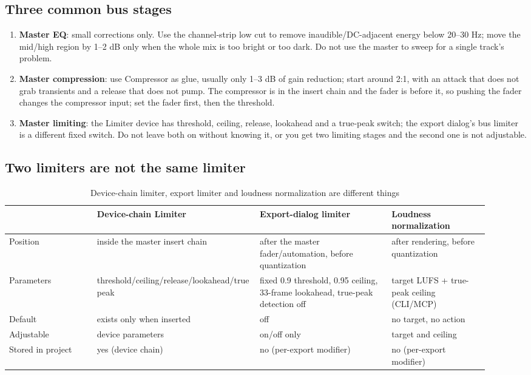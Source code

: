 \subsection{Three common bus stages}

\begin{enumerate}
  \item \textbf{Master EQ}: small corrections only. Use the channel-strip low cut to remove inaudible/DC-adjacent energy below 20--30 Hz; move the mid/high region by 1--2 dB only when the whole mix is too bright or too dark. Do not use the master to sweep for a single track's problem.
  \item \textbf{Master compression}: use Compressor as glue, usually only 1--3 dB of gain reduction; start around 2:1, with an attack that does not grab transients and a release that does not pump. The compressor is in the insert chain and the fader is before it, so pushing the fader changes the compressor input; set the fader first, then the threshold.
  \item \textbf{Master limiting}: the Limiter device has threshold, ceiling, release, lookahead and a true-peak switch; the export dialog's bus limiter is a different fixed switch. Do not leave both on without knowing it, or you get two limiting stages and the second one is not adjustable.
\end{enumerate}

\subsection{Two limiters are not the same limiter}

\begin{table}[htbp]
\centering
\small
\begin{tabular}{@{}p{0.18\linewidth}p{0.27\linewidth}p{0.27\linewidth}p{0.20\linewidth}@{}}
\hline
 & Device-chain Limiter & Export-dialog limiter & Loudness normalization \\
\hline
Position & inside the master insert chain & after the master fader/\allowbreak automation, before quantization & after rendering, before quantization \\
Parameters & threshold/\allowbreak ceiling/\allowbreak release/\allowbreak lookahead/\allowbreak true peak & fixed 0.9 threshold, 0.95 ceiling, 33-frame lookahead, true-peak detection off & target LUFS + true-peak ceiling (CLI/MCP) \\
Default & exists only when inserted & off & no target, no action \\
Adjustable & device parameters & on/off only & target and ceiling \\
Stored in project & yes (device chain) & no (per-export modifier) & no (per-export modifier) \\
\hline
\end{tabular}
\caption{Device-chain limiter, export limiter and loudness normalization are different things}
\label{tab:limiters}
\end{table}


